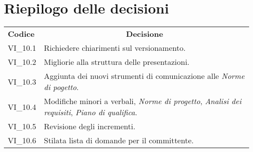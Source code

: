 % 
\section{Riepilogo delle decisioni}
\begin{longtable} {
		>{\centering}p{17mm} 
		>{}p{120mm}}
	\rowcolor{gray!50}
	\textbf{Codice} & \multicolumn{1}{c}{\textbf{Decisione}} \\
	VI\_10.1 & Richiedere chiarimenti sul versionamento. \TBstrut \\ [2mm]
	VI\_10.2 & Migliorie alla struttura delle presentazioni. \TBstrut \\ [2mm]
	VI\_10.3 & Aggiunta dei nuovi strumenti di comunicazione alle \textit{Norme di pogetto}. \TBstrut \\ [2mm]
	VI\_10.4 & Modifiche minori a verbali, \textit{Norme di progetto}, \textit{Analisi dei requisiti}, \textit{Piano di qualifica}. \TBstrut \\ [2mm]
	VI\_10.5 & Revisione degli incrementi. \TBstrut \\ [2mm]
	VI\_10.6 & Stilata lista di domande per il committente. \TBstrut \\ [2mm]
\end{longtable}